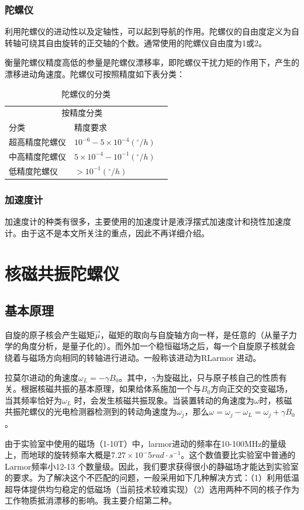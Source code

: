 \subsubsection{陀螺仪}
利用陀螺仪的进动性以及定轴性，可以起到导航的作用。陀螺仪的自由度定义为自转轴可绕其自由旋转的正交轴的个数。通常使用的陀螺仪自由度为1或2。
\par 衡量陀螺仪精度高低的参量是陀螺仪漂移率，即陀螺仪干扰力矩的作用下，产生的漂移进动角速度。陀螺仪可按照精度如下表分类：
\begin{table}[hbt]
	\caption{陀螺仪的分类}
	\centering
	\begin{tabular}{llr}
		\toprule
		\multicolumn{2}{c}{按精度分类} \\
		\cmidrule(r){1-2}
		分类 & 精度要求 \\
		\midrule
		超高精度陀螺仪 & $10^{-6}-5\times10^{-4}(^{\circ}/h)$ \\
		中高精度陀螺仪 & $5\times10^{-4}-10^{-1}(^{\circ}/h)$ \\
        低精度陀螺仪 & $>10^{-1}(^{\circ}/h)$ \\
		\bottomrule
	\end{tabular}
	\label{tab:label}
\end{table}
\subsubsection{加速度计}
加速度计的种类有很多，主要使用的加速度计是液浮摆式加速度计和挠性加速度计。由于这不是本文所关注的重点，因此不再详细介绍。
\section{核磁共振陀螺仪\cite{4}}
\subsection{基本原理}
自旋的原子核会产生磁矩$\vec{\mu}$，磁矩的取向与自旋轴方向一样，是任意的（从量子力学的角度分析，是量子化的）。而外加一个稳恒磁场之后，每一个自旋原子核就会绕着与磁场方向相同的转轴进行进动。一般称该进动为RLarmor 进动。
\par 拉莫尔进动的角速度$\omega_{L}=-\gamma B_{0}$。其中，$\gamma$为旋磁比，只与原子核自己的性质有关。根据核磁共振的基本原理，如果给体系施加一个与$B_{0}$方向正交的交变磁场，当其频率恰好为$\omega_{L}$ 时，会发生核磁共振现象。当装置转动的角速度为$\omega$时，核磁共振陀螺仪的光电检测器检测到的转动角速度为$\omega_j$，那么$\omega=\omega_j-\omega_L=\omega_j+\gamma B_0$。
\par 由于实验室中使用的磁场（1-10T）中，larmor进动的频率在10-100MHz的量级上，而地球的旋转频率大概是$7.27\times 10^-5 rad\cdot s^{-1}$。这个数值要比实验室中普通的Larmor频率小12-13 个数量级。因此，我们要求获得很小的静磁场才能达到实验室的要求。为了解决这个不匹配的问题，一般采用如下几种解决方式：（1）利用低温超导体提供均匀稳定的低磁场（当前技术较难实现）（2）选用两种不同的核子作为工作物质抵消漂移的影响。我主要介绍第二种。
